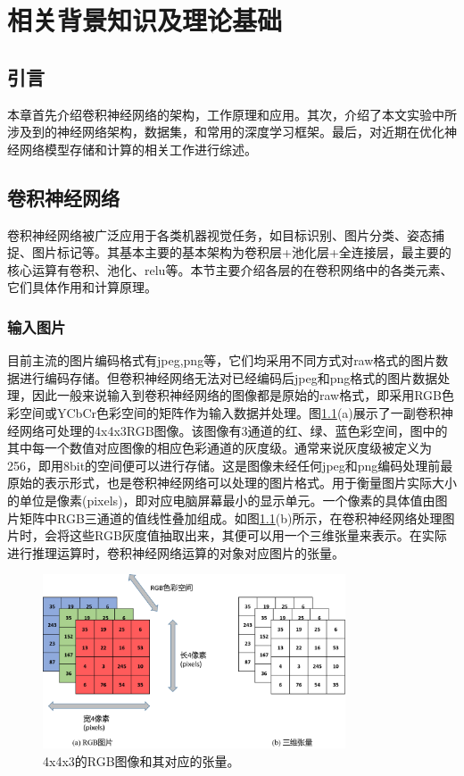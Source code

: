 

\chapter{相关背景知识及理论基础}

\section{引言}

本章首先介绍卷积神经网络的架构，工作原理和应用。其次，介绍了本文实验中所涉及到的神经网络架构，数据集，和常用的深度学习框架。最后，对近期在优化神经网络模型存储和计算的相关工作进行综述。

\section{卷积神经网络}
卷积神经网络被广泛应用于各类机器视觉任务，如目标识别、图片分类、姿态捕捉、图片标记等。其基本主要的基本架构为卷积层+池化层+全连接层，最主要的核心运算有卷积、池化、relu等。本节主要介绍各层的在卷积网络中的各类元素、它们具体作用和计算原理。
\subsection{输入图片}
目前主流的图片编码格式有jpeg,png等，它们均采用不同方式对raw格式的图片数据进行编码存储。但卷积神经网络无法对已经编码后jpeg和png格式的图片数据处理，因此一般来说输入到卷积神经网络的图像都是原始的raw格式，即采用RGB色彩空间或YCbCr色彩空间的矩阵作为输入数据并处理。图\ref{inputImage}(a)展示了一副卷积神经网络可处理的4x4x3RGB图像。该图像有3通道的红、绿、蓝色彩空间，图中的其中每一个数值对应图像的相应色彩通道的灰度级。通常来说灰度级被定义为256，即用8bit的空间便可以进行存储。这是图像未经任何jpeg和png编码处理前最原始的表示形式，也是卷积神经网络可以处理的图片格式。用于衡量图片实际大小的单位是像素(pixels)，即对应电脑屏幕最小的显示单元。一个像素的具体值由图片矩阵中RGB三通道的值线性叠加组成。如图\ref{inputImage}(b)所示，在卷积神经网络处理图片时，会将这些RGB灰度值抽取出来，其便可以用一个三维张量来表示。在实际进行推理运算时，卷积神经网络运算的对象对应图片的张量。

\begin{figure}[ht]
	\centering
	\includegraphics[width=0.8\textwidth]{figures/inputImage.png}
	\caption{4x4x3的RGB图像和其对应的张量。}
	\label{inputImage}
\end{figure}


